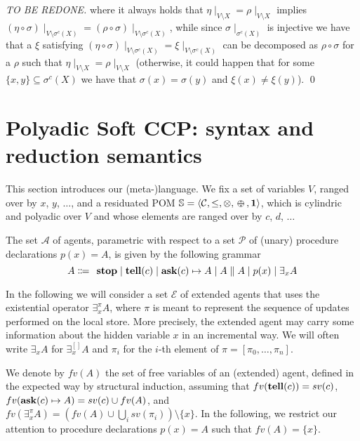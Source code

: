 \documentclass{llncs}
\def\1{{\mathbf 1}}
\newcommand{\tell}{{\bf tell}}
\newcommand{\ask}{{\bf ask}}
\newcommand{\ostop}{{\bf stop}}
\def\1{{\mathbf 1}}
\def\odiv{\, {\ominus\hspace{-7.7pt} \div} \,}
\begin{document}
\begin{proof}[TO BE REDONE]
\noindent
where it always holds that $\eta\mid_{V \setminus X} = \rho\mid_{V \setminus X}$ implies $(\eta\circ \sigma)\mid_{V \setminus \sigma^{c}(X)} = (\rho\circ \sigma)\mid_{V \setminus \sigma^{c}(X)}$,
while since $\sigma \mid_{\sigma^c(X)}$ is injective we have that
a $\xi$ satisfying $(\eta \circ \sigma)\mid_{V \setminus \sigma^{c}(X)} = \xi\mid_{V \setminus \sigma^{c}(X)}$ can be decomposed as $\rho\circ \sigma$
for a $\rho$ such that $\eta\mid_{V \setminus X} = \rho\mid_{V \setminus X}$
(otherwise, it could happen that for some $\{x, y\} \subseteq \sigma^c(X)$ we have that $\sigma(x) =\sigma(y)$ and 
$\xi(x) \neq \xi(y)$).
\qed
\end{proof}

\section{Polyadic Soft CCP: syntax and reduction semantics}\label{sec:detSCCP}
This section introduces our (meta-)language.
We fix a set of variables $V$, ranged over by $x$, $y$, $\ldots$, and 
a residuated POM $\mathbb S = \langle {\mathcal C}, \leq, \otimes, \odiv, \1\rangle$, 
which is cylindric and polyadic over $V$ and whose elements
are ranged over by $c$, $d$, $\ldots$

\begin{definition}[Agents]%
The set $\mathcal{A}$ of agents, %
parametric with respect to a set $\mathcal{P}$ of (unary) procedure declarations $p(x) = A$,
is given by the following grammar
\[ A \Coloneqq \: \: \mathit{\ostop} \mid \textit{\tell}(c)  \mid \textit{\ask}(c) \mapsto A \mid A \parallel A \mid %
p(x) \mid \exists_x A\]  
\end{definition}

In the following we will consider 
a set $\mathcal{E}$ of extended agents that uses the existential operator $\exists^{\pi}_x A$, 
where $\pi$ is meant to represent the sequence of updates performed on the local store. 
More precisely, the extended agent may carry some information about the hidden variable 
$x$ in an incremental way. We will often write $\exists_x A$ for $\exists^{[ ]}_x A$ and $\pi_i$ for 
the $i$-th element of $\pi = [ \pi_0, \ldots, \pi_n]$.

We denote by $fv(A)$ the set of free variables of an (extended) agent, defined in the expected way 
by structural induction, assuming that $fv(\tell(c)) = sv(c)$,
$fv(\ask(c) \mapsto A) = sv(c) \cup fv(A)$,
and $fv(\exists^{\pi}_x A) = (fv(A) \cup \bigcup_i sv(\pi_i)) \setminus \{x\}$.
%
In the following, we restrict our attention to 
procedure declarations $p(x) = A$ such that $fv(A) = \{x\}$.
\end{document}
